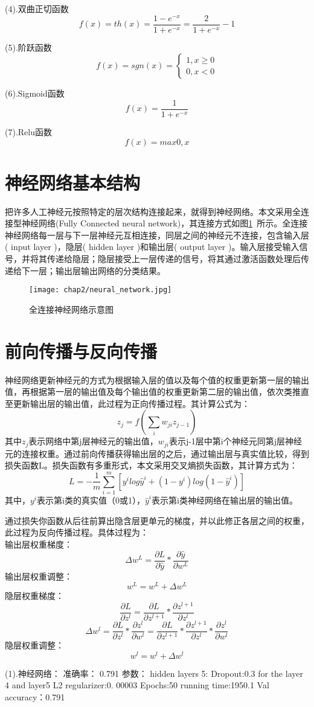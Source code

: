(4).双曲正切函数
$$f(x) = th(x) = \frac{1-e^{-x}}{1+e^{-x}} = \frac{2}{1+e^{-x}} -1$$

(5).阶跃函数
$$f(x) = sgn(x) = \left\{
\begin{aligned}
1, x \geq 0 \\
0, x < 0
\end{aligned}
\right.
$$

(6).Sigmoid函数
$$f(x) = \frac{1}{1+e^{-x}}$$

(7).Relu函数
$$f(x) = max{0,x}$$

\section{神经网络基本结构}
把许多人工神经元按照特定的层次结构连接起来，就得到神经网络。本文采用全连接型神经网络(Fully Connected neural network)，其连接方式如图\ref{fig:neural_network}~所示。全连接神经网络每一层与下一层神经元互相连接，同层之间的神经元不连接，包含输入层( input layer )，隐层( hidden layer )和输出层( output layer )。输入层接受输入信号，并将其传递给隐层；隐层接受上一层传递的信号，将其通过激活函数处理后传递给下一层；输出层输出网络的分类结果。
\begin{figure}[!htb]
  \centering
  \texttt{[image: chap2/neural\_network.jpg]}
  \caption{全连接神经网络示意图}
  \label{fig:neural_network}
\end{figure}
\section{前向传播与反向传播}
神经网络更新神经元的方式为根据输入层的值以及每个值的权重更新第一层的输出值，再根据第一层的输出值及每个输出值的权重更新第二层的输出值，依次类推直至更新输出层的输出值，此过程为正向传播过程。其计算公式为：
$$z_{j} = f(\sum_{i} w_{ji}z_{j-1})$$
其中$z_{j}$表示网络中第j层神经元的输出值，$w_{ji}$表示j-1层中第i个神经元同第j层神经元的连接权重。通过前向传播获得输出层的之后，通过输出层与真实值比较，得到损失函数L。损失函数有多重形式，本文采用交叉熵损失函数，其计算方式为：
$$L = -\frac{1}{m}\sum^{m}_{i=1}[ y^{i}log\hat{y}^{i}+(1-y^{i})log(1-\hat{y}^{i}) ]$$
其中，$y^{i}$表示第i类的真实值（0或1），$\hat{y}^{i}$表示第i类神经网络在输出层的输出值。

通过损失你函数从后往前算出隐含层更单元的梯度，并以此修正各层之间的权重，此过程为反向传播过程。具体过程为：\\
输出层权重梯度：
$$\Delta{w^{L}} = \frac{\partial{L}}{\partial{\hat{y}}}*\frac{\partial{\hat{y}}}{\partial{w^{L}}}$$
输出层权重调整：
$$w^{L} = w^{L} + \Delta{w^{L}}$$
隐层权重梯度：
$$\frac{\partial{L}}{\partial{z^{l}}} = \frac{\partial{L}}{\partial{z^{l+1}}}*\frac{\partial{z^{l+1}}}{\partial{z^{l}}}$$
$$\Delta{w^{l}} = \frac{\partial{L}}{\partial{z^{l}}}*\frac{\partial{z^{l}}}{\partial{w^{l}}} = \frac{\partial{L}}{\partial{z^{l+1}}}*\frac{\partial{z^{l+1}}}{\partial{z^{l}}}*\frac{\partial{z^{l}}}{\partial{w^{l}}}$$
隐层权重调整：
$$w^{l} = w^{l} + \Delta{w^{l}}$$









(1).神经网络：
准确率：
0.791
参数：
hidden layers 5:
Dropout:0.3 for the layer 4 and layer5 
L2 regularizer:0. 00003
Epochs:50
running time:1950.1
Val accuracy：0.791
